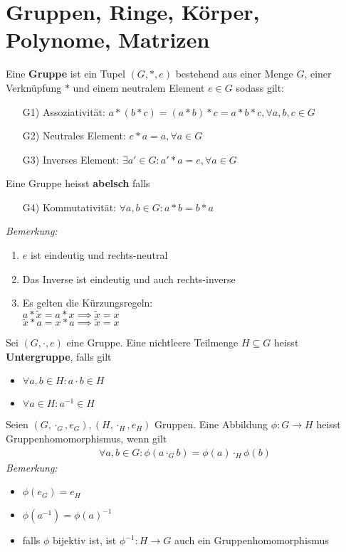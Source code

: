 \section{Gruppen, Ringe, Körper, Polynome, Matrizen}
\begin{mdframed}
Eine \textbf{Gruppe} ist ein Tupel $(G,*,e)$ bestehend aus einer Menge $G$, einer Verknüpfung $*$ und einem neutralem Element $e \in G$ sodass gilt:
\begin{itemize}
    \item[G1)]  Assoziativität: $a *(b*c) = (a*b)*c = a*b*c, \forall a,b,c \in G$
    \item[G2)] Neutrales Element: $e*a=a, \forall a \in G$
    \item[G3)] Inverses Element: $\exists a' \in G: a'*a = e, \forall a \in G$ 
\end{itemize}
    
\end{mdframed}
Eine Gruppe heisst \textbf{abelsch} falls 
\begin{itemize}
    \item[G4)] Kommutativität: $\forall a,b \in G: a*b = b*a$
\end{itemize}
\emph{Bemerkung:}
\begin{enumerate}[{(}a{)}]
    \item $e$ ist eindeutig und rechts-neutral
    \item Das Inverse ist eindeutig und auch rechts-inverse
    \item Es gelten die Kürzungsregeln:\\
     $a * \tilde{x} = a * x \implies \tilde{x} = x$\\
     $\tilde{x} * a = x * a \implies \tilde{x} = x$
\end{enumerate}
Sei $(G,\cdot,e)$ eine Gruppe. Eine nichtleere Teilmenge $H \subseteq G$ heisst \textbf{Untergruppe}, falls gilt
\begin{itemize}
    \item $\forall a, b \in H: a\cdot b \in H$
    
    \item $\forall a \in H: a^{-1} \in H$
\end{itemize}
Seien $(G,\cdot_G,e_G), (H,\cdot_H,e_H)$ Gruppen. Eine Abbildung $\phi: G \rightarrow H$ heisst Gruppenhomomorphismus, wenn gilt
\begin{align*}
    \forall a,b \in G: \phi(a \cdot_G b) = \phi(a)\cdot_H \phi(b)
\end{align*}
\emph{Bemerkung:}
\begin{itemize}
    \item $\phi(e_G) = e_H$
    \item $\phi(a^{-1}) = \phi(a)^{-1}$
    \item falls $\phi$ bijektiv ist, ist $\phi^{-1}: H \rightarrow G$ auch ein Gruppenhomomorphismus
\end{itemize}

